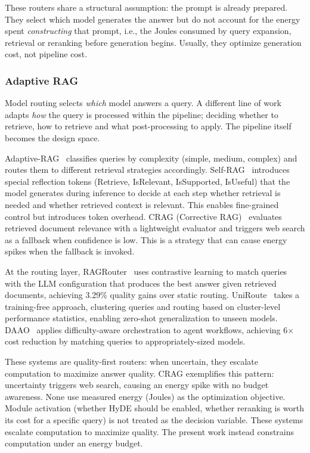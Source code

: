 These routers share a structural assumption: the prompt is already prepared. 
They select which model generates the answer but do not account for the energy 
spent \emph{constructing} that prompt, i.e., the Joules consumed by 
query expansion, retrieval or reranking before generation begins.
Usually, they optimize generation cost, not pipeline cost.



\subsubsection{Adaptive RAG}
\label{subsec:adaptive-rag}

Model routing selects \emph{which} model answers a query. A different line of 
work adapts \emph{how} the query is processed within the pipeline; deciding whether 
to retrieve, how to retrieve and what post-processing to apply. The pipeline itself 
becomes the design space.

Adaptive-RAG~\cite{adaptiverag2024} classifies queries by complexity (simple, medium, 
complex) and routes them to different retrieval strategies accordingly. 
Self-RAG~\cite{selfrag2024} introduces special reflection tokens (Retrieve, 
IsRelevant, IsSupported, IsUseful) that the model generates during inference to 
decide at each step whether retrieval is needed and whether retrieved context is 
relevant. This enables fine-grained control but introduces token overhead. CRAG 
(Corrective RAG)~\cite{crag2024} evaluates retrieved document relevance with a 
lightweight evaluator and triggers web search as a fallback when confidence is 
low. This is a strategy that can cause energy spikes when the fallback is invoked.

At the routing layer, RAGRouter~\cite{ragrouter2025} uses contrastive learning to 
match queries with the LLM configuration that produces the best answer given retrieved 
documents, achieving 3.29\% quality gains over static routing. 
UniRoute~\cite{uniroute2025} takes a training-free approach, clustering queries 
and routing based on cluster-level performance statistics, enabling zero-shot 
generalization to unseen models. DAAO~\cite{daao2025} applies difficulty-aware 
orchestration to agent workflows, achieving 6$\times$ cost reduction by matching 
queries to appropriately-sized models.

These systems are quality-first routers: when uncertain, they escalate computation 
to maximize answer quality. CRAG exemplifies this pattern: uncertainty triggers web 
search, causing an energy spike with no budget awareness. None use measured energy 
(Joules) as the optimization objective. Module activation (whether HyDE should be 
enabled, whether reranking is worth its cost for a specific query) is not treated as 
the decision variable. These systems escalate computation to maximize quality.
The present work instead constrains computation under an energy budget.


